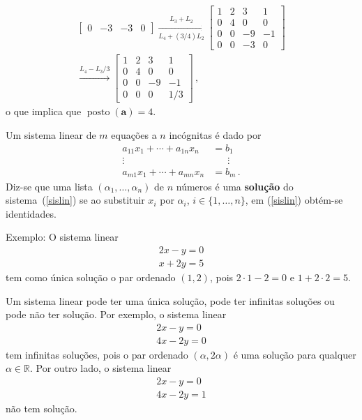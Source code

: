 \documentclass[12pt,a4paper]{report}
\newcommand{\tb}{\textbf}
\newcommand{\mb}{\mathbf}
\newcommand{\R}{\mathbb{R}}
\DeclareMathOperator{\posto}{posto}
\begin{document}
\begin{enumerate}
\begin{multline*}
\begin{bmatrix}
      0&-3&-3&0
    \end{bmatrix}\xrightarrow[L_4+(3/4)L_2]{L_3+L_2} \begin{bmatrix}
      1&2&3&1\\
      0&4&0&0\\
      0&0&-9&-1\\
      0&0&-3&0
    \end{bmatrix}\\
    \xrightarrow{L_4-L_3/3}\begin{bmatrix}
      1&2&3&1\\
      0&4&0&0\\
      0&0&-9&-1\\
      0&0&0&1/3
    \end{bmatrix}\,,
  \end{multline*}
  o que implica que $\posto(\mb a)=4$.
\end{enumerate}

Um sistema linear de $m$ equações a $n$ incógnitas é dado por
\begin{equation}
  \label{sislin}
  \begin{split}
    a_{11}x_1+\cdots+a_{1n}x_n&=b_1\\
    \vdots\qquad\qquad&\quad\;\;\vdots\\
    a_{m1}x_1+\cdots+a_{mn}x_n&=b_m\,.
  \end{split}
\end{equation}
Diz-se que uma lista $(\alpha_1,\ldots,\alpha_n)$ de $n$ números é uma \tb{solução} do sistema~(\ref{sislin}) se ao substituir $x_i$ por $\alpha_i$, $i\in\{1,\ldots,n\}$, em (\ref{sislin}) obtém-se identidades.

Exemplo: O sistema linear
\begin{equation*}
  \begin{split}
    2x-y=0\\
    x+2y=5
  \end{split}
\end{equation*}
tem como única solução o par ordenado $(1,2)$, pois $2\cdot 1-2=0$ e $1+2\cdot 2=5$.

Um sistema linear pode ter uma única solução, pode ter infinitas soluções ou pode não ter solução. Por exemplo, o sistema linear
\begin{equation*}
  \begin{split}
    2x-y=0\\
    4x-2y=0
  \end{split}
\end{equation*}
tem infinitas soluções, pois o par ordenado $(\alpha,2\alpha)$ é uma solução para qualquer $\alpha\in\R$. Por outro lado, o sistema linear
\begin{equation*}
  \begin{split}
    2x-y=0\\
    4x-2y=1
  \end{split}
\end{equation*}
não tem solução.
\end{document}
